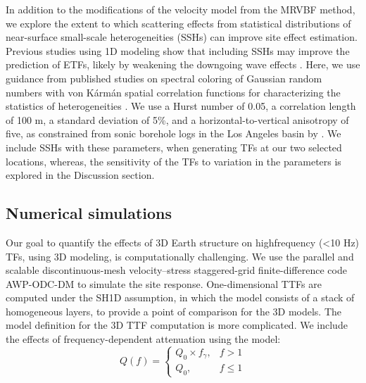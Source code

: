 In addition to the modifications of the velocity model from the MRVBF method, we explore the extent to which scattering effects from statistical distributions of near-surface small-scale heterogeneities (SSHs) can improve site effect estimation. Previous studies using 1D modeling show that including SSHs may improve the prediction of ETFs, likely by weakening the downgoing wave effects \citep{nourFiniteElementModel2003,thompsonTaxonomySiteResponse2012}. Here, we use guidance from published studies on spectral coloring of Gaussian random numbers with von K\'arm\'an spatial correlation functions for characterizing the statistics of heterogeneities \citep[see \cref{app:A}; as well as, e.g.,][]{frankelFiniteDifferenceSimulations1986,withersGroundMotionIntraevent2019}. We use a Hurst number of 0.05, a correlation length of 100 m, a standard deviation of 5\%, and a horizontal-to-vertical anisotropy of five, as constrained from sonic borehole logs in the Los Angeles basin by \citet{savranModelSmallscaleCrustal2016}. We include SSHs with these parameters, when generating TFs at our two selected locations, whereas, the sensitivity of the TFs to variation in the parameters is explored in the Discussion section.

\subsection{Numerical simulations}
Our goal to quantify the effects of 3D Earth structure on highfrequency (<10 Hz) TFs, using 3D modeling, is computationally challenging. We use the parallel and scalable discontinuous-mesh velocity–stress staggered-grid finite-difference code AWP-ODC-DM \citep{olsenSimulationThreeDimensional1994,cuiScalableEarthquakeSimulation2010,nieFourthOrderStaggered2017} to simulate the site response. One-dimensional TTFs are computed under the SH1D assumption, in which the model consists of a stack of homogeneous layers, to provide a point of comparison for the 3D models. The model definition for the 3D TTF computation is more complicated. We include the effects of frequency-dependent attenuation using the model:
\begin{equation}
  Q(f) =
  \begin{cases}
    Q_0 \times f_\gamma, & f > 1   \\
    Q_0,                 & f \le 1
    \label{eq:etf-4}
  \end{cases}
\end{equation}

